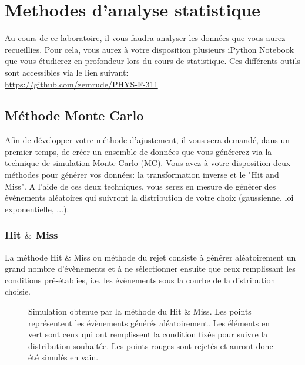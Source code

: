 \section{Methodes d'analyse statistique}

Au cours de ce laboratoire, il vous faudra analyser les données que vous aurez recueillies. Pour cela, vous aurez à votre disposition plusieurs iPython Notebook que vous étudierez en profondeur lors du cours de statistique. Ces différents outils sont accessibles via le lien suivant:\\
\url{https://github.com/zemrude/PHYS-F-311}

\subsection{Méthode Monte Carlo}
Afin de développer votre méthode d'ajustement, il vous sera demandé, dans un premier temps,  de créer un ensemble de données que vous générerez via la technique de simulation Monte Carlo (MC). Vous avez à votre disposition deux méthodes pour générer vos données: la transformation inverse et le "Hit and Miss". A l'aide de ces deux techniques, vous serez en mesure de générer des évènements aléatoires qui suivront la distribution de votre choix (gaussienne, loi exponentielle, ...).

\subsubsection{Hit $\&$ Miss}
La méthode Hit $\&$ Miss ou méthode du rejet consiste à générer aléatoirement un grand nombre d'évènements et à ne sélectionner ensuite que ceux remplissant les conditions pré-établies, i.e. les évènements sous la courbe de la distribution choisie. 

\begin{figure}[h!]
\caption{Simulation obtenue par la méthode du Hit $\&$ Miss. Les points représentent les évènements générés aléatoirement. Les éléments en vert sont ceux qui ont remplissent la condition fixée pour suivre la distribution souhaitée. Les points rouges sont rejetés et auront donc été simulés en vain.}
\label{fig:HitMiss}
\end{figure}

